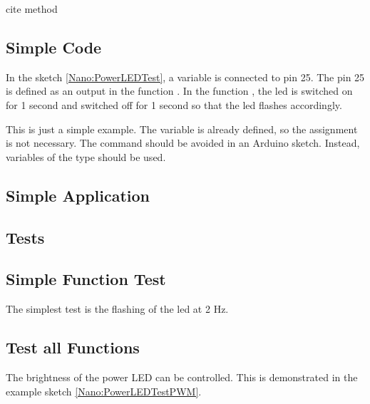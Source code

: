 cite method

\subsection{Simple Code}

In the sketch \ref{Nano:PowerLEDTest}, a variable is connected to pin 25. The pin 25 is defined as an output in the function . In the function , the \ac{led} is switched on for 1 second and switched off for 1 second so that the \ac{led} flashes accordingly.



{
	\label{Nano:PowerLEDTest}
}

\bigskip

This is just a simple example. The variable  is already defined, so the assignment is not necessary. The command  should be avoided in an Arduino sketch. Instead, variables of the type  should be used.


\subsection{Simple Application}



\subsection{Tests}

\subsection{Simple Function Test}

The simplest test is the flashing of the \ac{led} at 2 Hz.

{
	\label{Nano:PowerLEDTest}
}


\subsection{Test all Functions}

The brightness of the power LED can be controlled. This is demonstrated in the example sketch \ref{Nano:PowerLEDTestPWM}.

